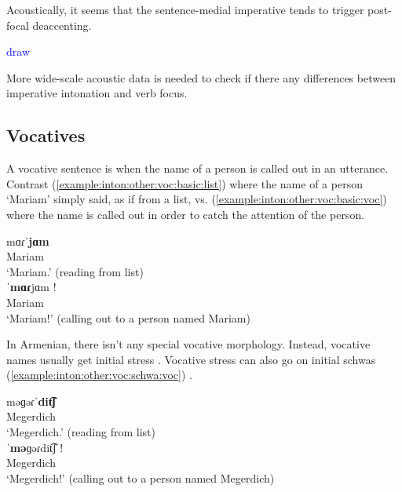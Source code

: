 Acoustically, it seems that the sentence-medial imperative tends to trigger post-focal deaccenting. 

\textcolor{blue}{draw}


More wide-scale acoustic data is needed to check if there any differences between imperative intonation and verb focus. 



\subsection{Vocatives}\label{section:intonation:other:vocative}

A vocative sentence is when  the name of a person is called out in an utterance. Contrast (\ref{example:inton:other:voc:basic:list}) where the name of a person `Mariam' simply said, as if from a list, vs. (\ref{example:inton:other:voc:basic:voc}) where the name is called out in order to catch the attention of the person. 

\begin{exe}
	\ex \begin{xlist}
		\ex \gll mɑɾˈ\textbf{jɑm} \\
		Mariam \\
		\trans `Mariam.' (reading from list)
		\label{example:inton:other:voc:basic:list}
		\\ 
		\ex \gll ˈ\textbf{mɑɾ}jɑm  !\\
		Mariam \\
		\trans `Mariam!' (calling out to a person named Mariam)
		\label{example:inton:other:voc:basic:voc}
		\\ 
		
	\end{xlist}
\end{exe}


In Armenian, there isn't any special vocative morphology. Instead,  vocative names usually get initial stress \citep[133]{Vaux-1998-ArmenianPhono}. Vocative stress can also go on initial schwas (\ref{example:inton:other:voc:schwa:voc}) \citep[220]{Gharagulyan-1974-BookArmenianOrthoepy}. 


\begin{exe}
	\ex \begin{xlist}
		\ex \gll məɡəɾˈ\textbf{dit͡ʃ} \\
		Megerdich \\
		\trans `Megerdich.' (reading from list)
		\\ \armenian{Մկրտիչ։}
		\ex \gll ˈ\textbf{mə}ɡəɾdit͡ʃ  !\\
		Megerdich \\
		\trans `Megerdich!' (calling out to a person named Megerdich)
		\label{example:inton:other:voc:schwa:voc}
		\\ \armenian{Մկրտիչ։}
		
	\end{xlist}
\end{exe}


